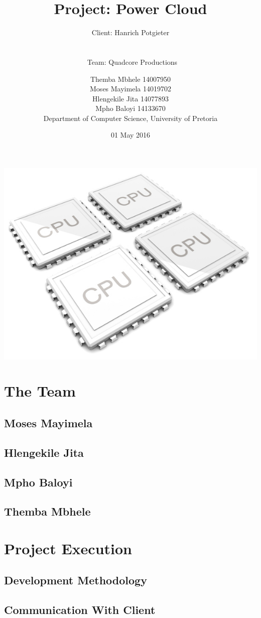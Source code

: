 \documentclass{scrartcl}
\title{Project: Power Cloud}
\subtitle{Client: Hanrich Potgieter \\\\\\\ Team: Quadcore Productions\\}
\author{Themba Mbhele 14007950\\ Moses Mayimela 14019702 \\ Hlengekile Jita 14077893 \\ Mpho Baloyi 14133670 \\Department of Computer Science, University of Pretoria}
\date{01 May 2016}
\begin{document}
\maketitle
\includegraphics[width=\textwidth]{2012-quad-core-phones}
\section{The Team}
\subsection{Moses Mayimela}
\subsection{Hlengekile Jita}
\subsection{Mpho Baloyi}
\subsection{Themba Mbhele}

\section{Project Execution}
\subsection{Development Methodology}
\subsection{Communication With Client}
\end{document}
